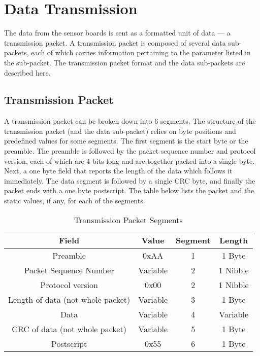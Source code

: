 \newpage
\section{Data Transmission} \label{section:overall}

The data from the sensor boards is sent as a formatted unit of data --- a transmission
packet. A transmission packet is composed of several data sub-packets, each
of which carries information pertaining to the parameter listed in the sub-packet.
The transmission packet format and the data sub-packets are described here.

\subsection{Transmission Packet}
A transmission packet can be broken down into 6 segments.
The structure of the transmission packet (and the data sub-packet) relies on
byte positions and predefined values for some segments. The first segment
is the start byte or
the preamble. The preamble is followed by the packet sequence number and protocol
version, each of which are 4 bits long and are together packed into a single byte.
Next, a one byte field that reports the length of the data which follows it
immediately. The data segment is
followed by a single CRC byte, and finally the packet ends with a one byte
postscript. The table below lists the packet and the static values, if any,
for each of the segments.

\begin{table}[H]
    \centering
    {
    \begin{tabular}{|c|c|c|c|}
        \hline
        \textbf{Field} & \textbf{Value} & \textbf{Segment} & \textbf{Length}\\
        \hline
        \hline
        Preamble & 0xAA & 1 & 1 Byte\\
        Packet Sequence Number & Variable & 2 & 1 Nibble\\
        Protocol version & 0x00 & 2 & 1 Nibble\\
        Length of data (not whole packet) & Variable & 3 & 1 Byte\\
        Data & Variable & 4 & Variable \\
        CRC of data (not whole packet) & Variable & 5 & 1 Byte\\
        Postscript & 0x55 & 6 & 1 Byte\\
        \hline
    \end{tabular}
    }
    \caption{Transmission Packet Segments}
    \label{table:packsegments}
\end{table}

